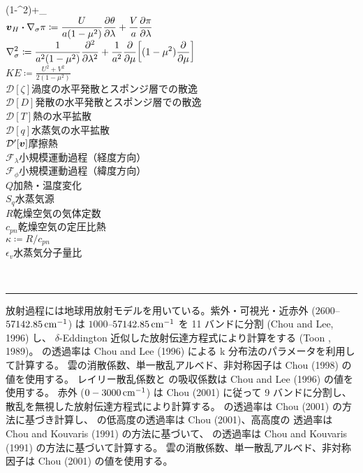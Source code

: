 \documentclass[body]{subfiles}
\begin{document}
\begin{table}[t]
\begin{minipage}{\textwidth}
\begin{minipage}{.5\textwidth}
\begin{tabbing}
					(1-\mu^2)\pdv{\pi}{\mu}+_\phi\cos\phi\)\\
				\(\displaystyle\vb*{v}_H\vdot\nabla_\sigma\pi\coloneqq
					\frac{U}{a(1-\mu^2)}\pdv{\theta}{\lambda}+\frac{V}{a}\pdv{\pi}{\lambda}\)\\
				\(\displaystyle\nabla_\sigma^2\coloneqq\frac{1}{a^2(1-\mu^2)}\pdv[2]{}{\lambda}
					+\frac{1}{a^2}\pdv{}{\mu}\qty[(1-\mu^2)\pdv{}{\mu}]\)\\
				\(\displaystyle KE\coloneqq\frac{U^2+V^2}{2(1-\mu^2)}\)\\
				\(\mathcal{D}[\zeta]\)\>渦度の水平発散とスポンジ層での散逸\\
				\(\mathcal{D}[D]\)\>発散の水平発散とスポンジ層での散逸\\
				\(\mathcal{D}[T]\)\>熱の水平拡散\\
				\(\mathcal{D}[q]\)\>水蒸気の水平拡散\\
				\(\mathcal{D}'[\vb*{v}]\)\>摩擦熱\\
				\(\mathcal{F}_\lambda\)\>小規模運動過程（経度方向）\\
				\(\mathcal{F}_\phi\)\>小規模運動過程（緯度方向）\\
				\(Q\)\>加熱・温度変化\\
				\(S_q\)\>水蒸気源\\
				\(R\)\>乾燥空気の気体定数\\
				\(c_{pn}\)\>乾燥空気の定圧比熱\\
				\(\kappa\coloneqq R/c_{pn}\)\\
				\(\epsilon_v\)\>水蒸気分子量比
			\end{tabbing}
		\end{minipage}\\
		\rule[0pt]{\textwidth}{\heavyrulewidth}
	\end{minipage}
\end{table}

放射過程には地球用放射モデルを用いている。紫外・可視光・近赤外 (\(2600\)--\(57142.85\hmu{cm^{-1}}\))
は \(1000\)--\(57142.85\hmu{cm^{-1}}\) を 11 バンドに分割 (Chou and Lee, 1996) し、
\(\delta\)-Eddington 近似した放射伝達方程式により計算をする (Toon \etal*, 1989)。
 の透過率は Chou and Lee (1996) による k 分布法のパラメータを利用して計算する。
雲の消散係数、単一散乱アルベド、非対称因子は Chou \etal (1998) の値を使用する。
レイリー散乱係数と  の吸収係数は Chou and Lee (1996) の値を使用する。
赤外 (\(0-3000\hmu{cm^{-1}}\)) は Chou \etal (2001) に従って 9 バンドに分割し、
散乱を無視した放射伝達方程式により計算する。 の透過率は Chou \etal (2001)
の方法に基づき計算し、 の低高度の透過率は Chou \etal (2001)、高高度の
透過率は Chou and Kouvaris (1991) の方法に基づいて、 の透過率は
Chou and Kouvaris (1991) の方法に基づいて計算する。
雲の消散係数、単一散乱アルベド、非対称因子は Chou \etal (2001) の値を使用する。
\end{document}
